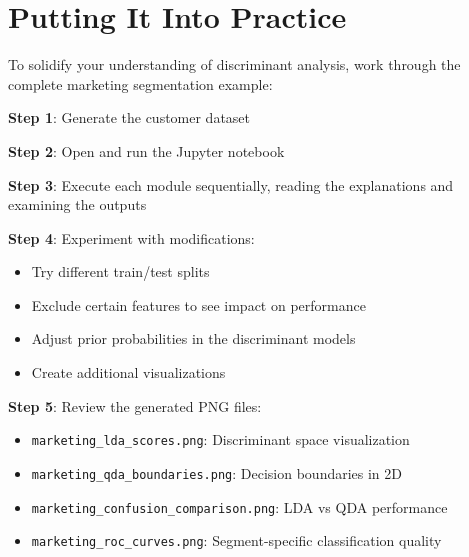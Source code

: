 \documentclass[
]{article}
\begin{document}
\section{Putting It Into Practice}

To solidify your understanding of discriminant analysis, work through
the complete marketing segmentation example:

\textbf{Step 1}: Generate the customer dataset

\begin{Shaded}
\begin{Highlighting}[]
\end{Highlighting}
\end{Shaded}

\textbf{Step 2}: Open and run the Jupyter notebook

\begin{Shaded}
\begin{Highlighting}[]
\end{Highlighting}
\end{Shaded}

\textbf{Step 3}: Execute each module sequentially, reading the
explanations and examining the outputs

\textbf{Step 4}: Experiment with modifications:

\begin{itemize}
\item
  Try different train/test splits
\item
  Exclude certain features to see impact on performance
\item
  Adjust prior probabilities in the discriminant models
\item
  Create additional visualizations
\end{itemize}

\textbf{Step 5}: Review the generated PNG files:

\begin{itemize}
\item
  \texttt{marketing\_lda\_scores.png}: Discriminant space visualization
\item
  \texttt{marketing\_qda\_boundaries.png}: Decision boundaries in 2D
\item
  \texttt{marketing\_confusion\_comparison.png}: LDA vs QDA performance
\item
  \texttt{marketing\_roc\_curves.png}: Segment-specific classification
  quality
\end{itemize}
\end{document}

